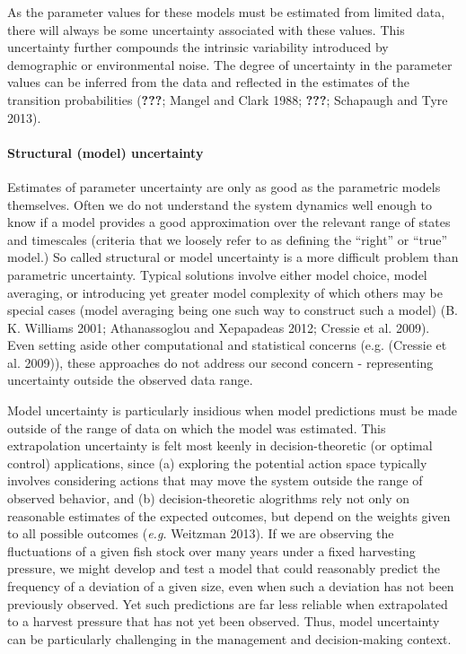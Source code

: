 \documentclass[author-year, review]{elsarticle} %
\begin{document}
As the parameter values for these models must be estimated from limited
data, there will always be some uncertainty associated with these
values. This uncertainty further compounds the intrinsic variability
introduced by demographic or environmental noise. The degree of
uncertainty in the parameter values can be inferred from the data and
reflected in the estimates of the transition probabilities
({\textbf{???}}; Mangel and Clark 1988; {\textbf{???}}; Schapaugh and
Tyre 2013).

\paragraph{Structural (model)
uncertainty}\label{structural-model-uncertainty}

Estimates of parameter uncertainty are only as good as the parametric
models themselves. Often we do not understand the system dynamics well
enough to know if a model provides a good approximation over the
relevant range of states and timescales (criteria that we loosely refer
to as defining the ``right'' or ``true'' model.) So called structural or
model uncertainty is a more difficult problem than parametric
uncertainty. Typical solutions involve either model choice, model
averaging, or introducing yet greater model complexity of which others
may be special cases (model averaging being one such way to construct
such a model) (B. K. Williams 2001; Athanassoglou and Xepapadeas 2012;
Cressie et al. 2009). Even setting aside other computational and
statistical concerns (e.g. (Cressie et al. 2009)), these approaches do
not address our second concern - representing uncertainty outside the
observed data range.

Model uncertainty is particularly insidious when model predictions must
be made outside of the range of data on which the model was estimated.
This extrapolation uncertainty is felt most keenly in decision-theoretic
(or optimal control) applications, since (a) exploring the potential
action space typically involves considering actions that may move the
system outside the range of observed behavior, and (b)
decision-theoretic alogrithms rely not only on reasonable estimates of
the expected outcomes, but depend on the weights given to all possible
outcomes (\emph{e.g.} Weitzman 2013). If we are observing the
fluctuations of a given fish stock over many years under a fixed
harvesting pressure, we might develop and test a model that could
reasonably predict the frequency of a deviation of a given size, even
when such a deviation has not been previously observed. Yet such
predictions are far less reliable when extrapolated to a harvest
pressure that has not yet been observed. Thus, model uncertainty can be
particularly challenging in the management and decision-making context.
\end{document}

